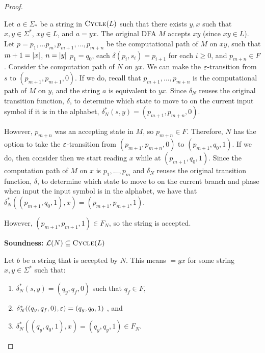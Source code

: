 \begin{problem}
\begin{Answer}
\begin{claim}
\begin{proof}
\begin{enumroman}
            \step
            Let $a \in \Sigma_*$ be a string in $\textsc{Cycle}(L)$
            such that there exists $y, x$ such that $x, y \in \Sigma^*$, $xy \in L$, and $a = yx$.
            The original DFA $M$ accepts $xy$ (since $xy \in L$).
            Let $p = p_1, \ldots p_m,p_{m+1}, \ldots, p_{m+n}$ be the computational
            path of $M$ on $xy$, such that $m+1 = \lvert x\rvert$, $n = \lvert y\rvert$
            $p_1 = q_0$, each $\delta(p_i, s_i) = p_{i+1}$ for each $i \ge 0$, and $p_{m+n} \in F$.
            Consider the computation path of $N$ on $yx$.
            We can make the $\varepsilon$-transition from $s$ to $(p_{m+1}, p_{m+1}, 0)$.
            If we do, recall that $p_{m+1}, \ldots, p_{m+n}$ is the computational path of $M$ on $y$,
            and the string $a$ is equivalent to $yx$.
            Since $\delta_N$ reuses the original transition function, $\delta$, to determine which
            state to move to on the current input symbol if it is in the alphabet,
            $\delta^*_N(s, y) = (p_{m+1}, p_{m+n}, 0)$.

            \step
            However, $p_{m+n}$ was an accepting state in $M$, so $p_{m+n} \in F$.
            Therefore, $N$ has the option to take the $\varepsilon$-transition from $(p_{m+1}, p_{m+n}, 0)$ to $(p_{m+1}, q_0, 1)$.
            If we do, then consider then we start reading $x$ while at $(p_{m+1}, q_0, 1)$.
            Since the computation path of $M$ on $x$ is $p_1, \ldots, p_m$
            and $\delta_N$ reuses the original transition function, $\delta$, to determine which
            state to move to on the current branch and phase when input the input symbol is in the alphabet,
            we have that $\delta^*_N((p_{m+1}, q_0, 1), x) = (p_{m+1}, p_{m+1}, 1)$.

            \step
            However, $(p_{m+1}, p_{m+1}, 1) \in F_N$, so the string is accepted.

          \newpage
          \item \textbf{Soundness:}  $\mathcal{L}(N) \subseteq \textsc{Cycle}(L)$
          
            \step
            Let $b$ be a string that is accepted by $N$.
            This means $ = yx$ for some string $x, y \in \Sigma^*$ such that:
            \begin{enumerate}
              \item $\delta_N^*(s, y) = (q_y, q_f, 0)$ such that $q_f \in F$,
              \item $\delta_N^*((q_y, q_f, 0), \varepsilon) = (q_y, q_0, 1)$ \quad {}, and
              \item $\delta_N^*((q_y, q_0, 1), x) = (q_y, q_y, 1) \in F_N$.
            \end{enumerate}


\end{enumroman}
\end{proof}
\end{claim}
\end{Answer}
\end{problem}
